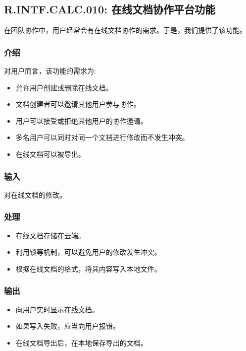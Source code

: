 \subsection{R.INTF.CALC.010: 在线文档协作平台功能}
在团队协作中，用户经常会有在线文档协作的需求。于是，我们提供了该功能。
\subsubsection{介绍}
对用户而言，该功能的需求为:
\begin{itemize}
  \item 允许用户创建或删除在线文档。
  \item 文档创建者可以邀请其他用户参与协作。
  \item 用户可以接受或拒绝其他用户的协作邀请。
  \item 多名用户可以同时对同一个文档进行修改而不发生冲突。
  \item 在线文档可以被导出。
\end{itemize}
\subsubsection{输入}
对在线文档的修改。
\subsubsection{处理}
\begin{itemize}
  \item 在线文档存储在云端。
  \item 利用锁等机制，可以避免用户的修改发生冲突。
  \item 根据在线文档的格式，将其内容写入本地文件。
\end{itemize}
\subsubsection{输出}
\begin{itemize}
  \item 向用户实时显示在线文档。
  \item 如果写入失败，应当向用户报错。
  \item 在线文档导出后，在本地保存导出的文档。
\end{itemize}
